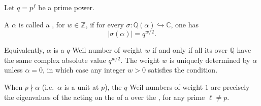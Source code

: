 \begin{definition} \label{definition:q_Weil_number}
Let $q = p^f$ be a prime power.

A  $\alpha$ is called a , for $w \in \mathbb{Z}$, if for every  $\sigma: \mathbb{Q}(\alpha) \hookrightarrow \mathbb{C}$, one has
$$|\sigma(\alpha)| = q^{w/2}.$$

Equivalently, $\alpha$ is a $q$-Weil number of weight $w$ if and only if all its  over $\mathbb{Q}$ have the same complex absolute value $q^{w/2}$. The weight $w$ is uniquely determined by $\alpha$ unless $\alpha = 0$, in which case any integer $w > 0$ satisfies the condition.

When $p \nmid \alpha$ (i.e.\ $\alpha$ is a unit at $p$), the $q$-Weil numbers of weight $1$ are precisely the eigenvalues of the  acting on the  of a   over the , for any prime $\ell \neq p$.
\end{definition}